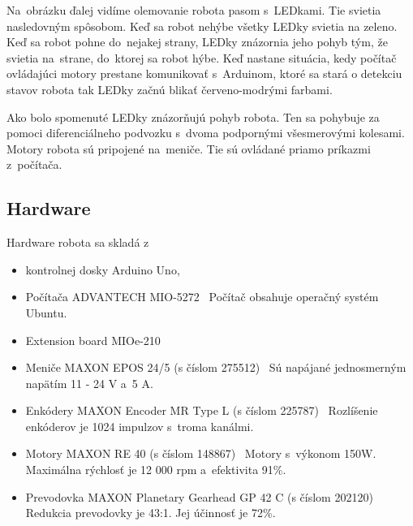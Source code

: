 \noindent Na~obrázku ďalej vidíme olemovanie robota pasom s~LEDkami. Tie svietia nasledovným spôsobom. Keď sa robot nehýbe všetky LEDky svietia
na zeleno. Keď sa robot pohne do~nejakej strany, LEDky znázornia jeho pohyb tým, že svietia na~strane, do~ktorej sa robot hýbe. Keď nastane
situácia, kedy počítač ovládajúci motory prestane komunikovať s~Arduinom, ktoré sa stará o detekciu stavov robota tak LEDky začnú blikať červeno-modrými farbami.

Ako bolo spomenuté LEDky znázorňujú pohyb robota. Ten sa pohybuje za pomoci diferenciálneho podvozku s~dvoma podpornými všesmerovými kolesami. Motory robota
sú pripojené na~meniče. Tie sú ovládané priamo príkazmi z~počítača.

\subsection{Hardware}

Hardware robota sa skladá z
\begin{itemize}
	\item kontrolnej dosky Arduino Uno,

	\item Počítača ADVANTECH MIO-5272~\cite{robotPc} \newline
		Počítač obsahuje operačný systém Ubuntu.

	\item Extension board MIOe-210~\cite{extensionModule}

	\item Meniče MAXON EPOS 24/5 (s číslom 275512)~\cite{menic} \newline
	 	Sú napájané jednosmerným napätím 11 - 24 V a~5 A.

	\item Enkódery MAXON Encoder MR Type L (s číslom 225787)~\cite{encoder} \newline
		Rozlíšenie enkóderov je 1024 impulzov s~troma kanálmi.

	\item Motory MAXON RE 40 (s číslom 148867)~\cite{motor} \newline
		Motory s~výkonom 150W. Maximálna rýchlosť je 12 000 rpm a~efektivita 91\%.

	\item Prevodovka MAXON Planetary Gearhead GP 42 C (s číslom 202120)~\cite{prevodovka} \newline
		Redukcia prevodovky je 43:1. Jej účinnosť je 72\%.
\end{itemize}

